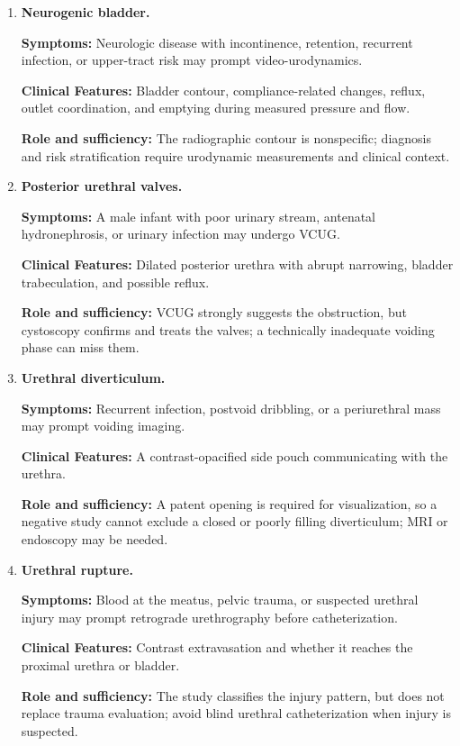 \begin{enumerate}[leftmargin=*,itemsep=0.45em,topsep=0.4em]
\item \textbf{Neurogenic bladder.}\par\noindent\textbf{Symptoms:} Neurologic disease with incontinence, retention, recurrent infection, or upper-tract risk may prompt video-urodynamics.\par\noindent\textbf{Clinical Features:} Bladder contour, compliance-related changes, reflux, outlet coordination, and emptying during measured pressure and flow.\par\noindent\textbf{Role and sufficiency:} The radiographic contour is nonspecific; diagnosis and risk stratification require urodynamic measurements and clinical context.
\item \textbf{Posterior urethral valves.}\par\noindent\textbf{Symptoms:} A male infant with poor urinary stream, antenatal hydronephrosis, or urinary infection may undergo VCUG.\par\noindent\textbf{Clinical Features:} Dilated posterior urethra with abrupt narrowing, bladder trabeculation, and possible reflux.\par\noindent\textbf{Role and sufficiency:} VCUG strongly suggests the obstruction, but cystoscopy confirms and treats the valves; a technically inadequate voiding phase can miss them.
\item \textbf{Urethral diverticulum.}\par\noindent\textbf{Symptoms:} Recurrent infection, postvoid dribbling, or a periurethral mass may prompt voiding imaging.\par\noindent\textbf{Clinical Features:} A contrast-opacified side pouch communicating with the urethra.\par\noindent\textbf{Role and sufficiency:} A patent opening is required for visualization, so a negative study cannot exclude a closed or poorly filling diverticulum; MRI or endoscopy may be needed.
\item \textbf{Urethral rupture.}\par\noindent\textbf{Symptoms:} Blood at the meatus, pelvic trauma, or suspected urethral injury may prompt retrograde urethrography before catheterization.\par\noindent\textbf{Clinical Features:} Contrast extravasation and whether it reaches the proximal urethra or bladder.\par\noindent\textbf{Role and sufficiency:} The study classifies the injury pattern, but does not replace trauma evaluation; avoid blind urethral catheterization when injury is suspected.

\end{enumerate}
